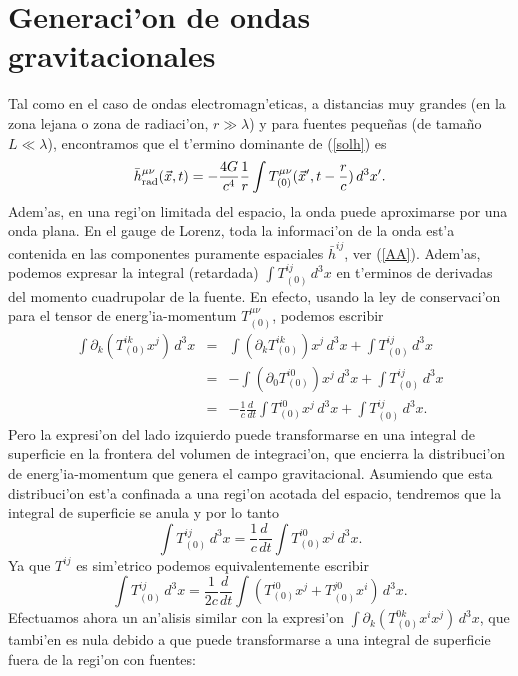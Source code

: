 \section{Generaci'on de ondas gravitacionales}\label{sec:GOG}
Tal como en el caso de ondas electromagn'eticas, a distancias muy grandes (en la zona lejana o zona de radiaci'on, $r\gg\lambda$) y para fuentes peque\~nas (de tama\~no $L\ll\lambda$), encontramos que el t'ermino dominante de (\ref{solh}) es
\begin{equation}\label{hradT}
\bar{h}_{\rm rad}^{\mu\nu}(\vec{x},t)=-\frac{4G}{c^4} \frac{1}{r}\int T^{\mu\nu}_{(0)}(\vec{x}',t-\frac{r}{c})\, d^3x'.
\end{equation}
Adem'as, en una regi'on limitada del espacio, la onda puede aproximarse por una onda plana. En el gauge de Lorenz, toda la informaci'on de la onda est'a contenida en las componentes puramente espaciales $\bar{h}^{ij}$, ver (\ref{AA}). Adem'as, podemos expresar la integral (retardada) $\int T^{ij}_{(0)}\,d^3x$ en t'erminos de derivadas del momento cuadrupolar de la fuente. En efecto, usando la ley de conservaci'on para el tensor de energ'ia-momentum $T^{\mu\nu}_{(0)}$, podemos escribir
\begin{eqnarray}
 \int \partial_k(T^{ik}_{(0)}x^j)\,d^3x&=&\int (\partial_kT^{ik}_{(0)})x^j\,d^3x +\int T^{ij}_{(0)}\,d^3x \\
&=&-\int (\partial_0T^{i0}_{(0)})x^j\,d^3x +\int T^{ij}_{(0)}\,d^3x \\
&=&-\frac{1}{c}\frac{d\ }{dt}\int T^{i0}_{(0)}x^j\,d^3x +\int T^{ij}_{(0)}\,d^3x .
\end{eqnarray}
Pero la expresi'on del lado izquierdo puede transformarse en una integral de superficie en la frontera del volumen de integraci'on, que encierra la distribuci'on de energ'ia-momentum que genera el campo gravitacional. Asumiendo que esta distribuci'on est'a confinada a una regi'on acotada del espacio, tendremos que la integral de superficie se anula y por lo tanto
\begin{equation}
 \int T^{ij}_{(0)}\,d^3x =\frac{1}{c}\frac{d\ }{dt}\int T^{i0}_{(0)}x^j\,d^3x.
\end{equation}
Ya que $T^{ij}$ es sim'etrico podemos equivalentemente escribir
\begin{equation}\label{intT1}
 \int T^{ij}_{(0)}\,d^3x =\frac{1}{2c}\frac{d\ }{dt}\int \left(T^{i0}_{(0)}x^j+T^{j0}_{(0)}x^i\right)\,d^3x.
\end{equation}
Efectuamos ahora un an'alisis similar con la expresi'on $\int\partial_k(T^{0k}_{(0)}x^ix^j)\,d^3x$, que tambi'en es nula debido a que puede transformarse a una integral de superficie fuera de la regi'on con fuentes:
